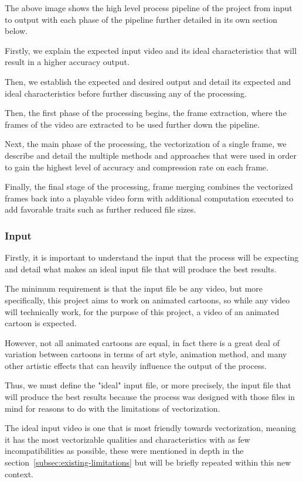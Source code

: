 \documentclass[12pt]{article}
\newcommand{\sentence}{} %
\renewcommand{\fullref}[1]{\ref{#1}\nameref{#1}}
\begin{document}
    The above image shows the high level process pipeline of the project from input to output with each phase of the
    pipeline further detailed in its own section below.
    \sentence
    Firstly, we explain the expected input video and its ideal characteristics that will result in a higher accuracy
    output.
    \sentence
    Then, we establish the expected and desired output and detail its expected and ideal characteristics before
    further discussing any of the processing.
    \sentence
    Then, the first phase of the processing begins, the frame extraction, where the frames of the video are
    extracted to be used further down the pipeline.
    \sentence
    Next, the main phase of the processing, the vectorization of a single frame, we describe and detail the multiple methods
    and approaches that were used in order to gain the highest level of accuracy and compression rate on each frame.
    \sentence
    Finally, the final stage of the processing, frame merging combines the vectorized frames back into a playable
    video form with additional computation executed to add favorable traits such as further reduced file sizes.

    \subsubsection{Input}\label{subsubsec:input}

    \tab
    Firstly, it is important to understand the input that the process will be expecting and detail what makes an ideal
    input file that will produce the best results.
    \sentence
    The minimum requirement is that the input file be any video, but more specifically, this project
    aims to work on animated cartoons, so while any video will technically work, for the purpose of this project, a
    video of an animated cartoon is expected.
    \sentence
    However, not all animated cartoons are equal, in fact there is a great deal of variation between cartoons in
    terms of art style, animation method, and many other artistic effects that can heavily influence the output of
    the process.
    \sentence
    Thus, we must define the "ideal" input file, or more precisely, the input file that will produce the best results
    because the process was designed with those files in mind for reasons to do with the limitations of vectorization.
    \sentence
    The ideal input video is one that is most friendly towards vectorization, meaning it has the most vectorizable
    qualities and characteristics with as few incompatibilities as possible, these were mentioned in depth
    in the section~\fullref{subsec:existing-limitations} but will be briefly repeated within this new context.
\end{document}

